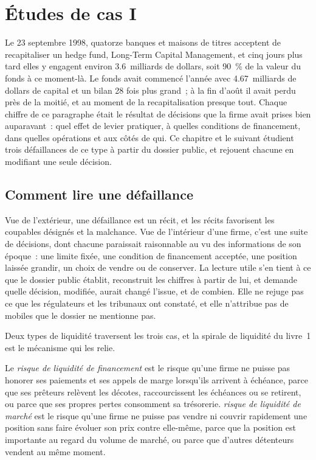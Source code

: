 \chapter{Études de cas I}\label{ch:fm:case-studies-i}

Le 23 septembre 1998, quatorze banques et maisons de titres acceptent de recapitaliser un hedge fund, Long-Term Capital Management, et cinq jours plus tard
elles y engagent environ 3.6~milliards de dollars, soit 90~\% de la valeur du fonds à ce moment-là. Le fonds avait commencé l'année avec 4.67~milliards de dollars de capital et un bilan
28 fois plus grand~; à la fin d'août il avait perdu près de la moitié, et au moment de la recapitalisation presque tout. Chaque chiffre de ce paragraphe était
le résultat de décisions que la firme avait prises bien auparavant~: quel effet de levier pratiquer, à quelles conditions de financement, dans quelles opérations et aux côtés de qui. Ce chapitre
et le suivant étudient trois défaillances de ce type à partir du dossier public, et rejouent chacune en modifiant une seule décision.

\section{Comment lire une défaillance}

Vue de l'extérieur, une défaillance est un récit, et les récits favorisent les coupables désignés et la malchance. Vue de l'intérieur d'une firme, c'est une suite de décisions, dont chacune
paraissait raisonnable au vu des informations de son époque~: une limite fixée, une condition de financement acceptée, une position laissée grandir, un choix de vendre ou
de conserver. La lecture utile s'en tient à ce que le dossier public établit, reconstruit les chiffres à partir de lui, et demande quelle décision, modifiée, aurait
changé l'issue, et de combien. Elle ne rejuge pas ce que les régulateurs et les tribunaux ont constaté, et elle n'attribue pas de mobiles que le dossier
ne mentionne pas.

Deux types de liquidité traversent les trois cas, et la spirale de liquidité du livre~1 est le mécanisme qui les relie.

\begin{definition}\label{def:fm:case-studies-i:liquidity}
Le \emph{risque de liquidité de financement} est le risque qu'une firme ne puisse pas honorer ses paiements et ses appels de marge lorsqu'ils arrivent à échéance,
parce que ses prêteurs relèvent les décotes, raccourcissent les échéances ou se retirent, ou parce que ses propres pertes consomment sa trésorerie. \emph{risque de liquidité
de marché} est le risque qu'une firme ne puisse pas vendre ni couvrir rapidement une position sans faire évoluer son prix contre elle-même, parce que
la position est importante au regard du volume de marché, ou parce que d'autres détenteurs vendent au même moment.
\end{definition}

